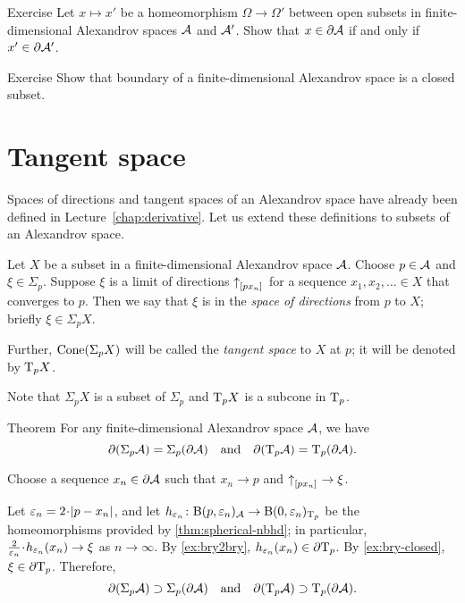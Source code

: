 \begin{thm}{Exercise}\label{ex:bry2bry}
Let $x\mapsto x'$ be a homeomorphism $\Omega\to\Omega'$
between open subsets in finite-dimensional Alexandrov spaces $\mathcal{A}$ and $\mathcal{A}'$.
Show that $x\in \partial \mathcal{A}$ if and only if $x'\in \partial \mathcal{A}'$.

\end{thm}

\begin{thm}{Exercise}\label{ex:bry-closed}
Show that boundary of a finite-dimensional Alexandrov space is a closed subset.
\end{thm}

\section{Tangent space}

Spaces of directions and tangent spaces of an Alexandrov space have already been defined in Lecture~\ref{chap:derivative}.
Let us extend these definitions to subsets of an Alexandrov space.

Let $X$ be a subset in a finite-dimensional Alexandrov space $\mathcal{A}$.
Choose $p\in \mathcal{A}$ and $\xi\in \Sigma_p$.
Suppose $\xi$ is a limit of directions ${\uparrow}_{[{p}{x_n}]_{{}}}$ for a sequence $x_1,x_2,\dots{}\in X$ that converges to $p$.
Then we say that $\xi$ is in the \emph{space of directions} from $p$ to $X$;
briefly $\xi\in\Sigma_pX$.

Further, $\mathop{\rm Cone}\nolimits(\Sigma_pX)$ will be called the \emph{tangent space} to $X$ at $p$;
it will be denoted by $\mathrm{T}_pX$.

Note that $\Sigma_pX$ is a subset of $\Sigma_p$ and $\mathrm{T}_pX$ is a subcone in $\mathrm{T}_p$.

\begin{thm}{Theorem}\label{thm:partial-Sigma}
For any finite-dimensional Alexandrov space $\mathcal{A}$, we have
\[\partial (\Sigma_p\mathcal{A})=\Sigma_p(\partial\mathcal{A})
\quad\text{and}\quad
\partial(\mathrm{T}_p\mathcal{A})=\mathrm{T}_p(\partial\mathcal{A}).\]
\end{thm}

Choose a sequence $x_n\in \partial \mathcal{A}$ such that $x_n\to p$ and ${\uparrow}_{[{p}{x_n}]_{{}}}\to\xi$.

Let $\eps_n=2\cdot \dist{p}{x_n}{}$,
and let $h_{\varepsilon_n}\colon\mathrm{B}{}(p,\varepsilon_n)_{\mathcal{A}}\to \mathrm{B}{}(0,\varepsilon_n)_{\mathrm{T}_p}$ be the homeomorphisms provided by \ref{thm:spherical-nbhd};
in particular, $\tfrac2{\eps_n}\cdot h_{\eps_n}(x_n)\to \xi$ as $n\to\infty$.
By \ref{ex:bry2bry}, $h_{\varepsilon_n}(x_n)\in \partial \mathrm{T}_p$.
By \ref{ex:bry-closed}, $\xi\in \partial \mathrm{T}_p$.
Therefore,
\[\partial (\Sigma_p\mathcal{A})\supset\Sigma_p(\partial\mathcal{A})
\quad\text{and}\quad
\partial(\mathrm{T}_p\mathcal{A})\supset\mathrm{T}_p(\partial\mathcal{A}).\]

